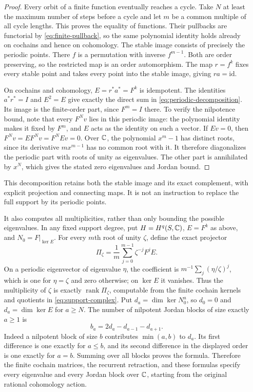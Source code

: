\begin{proof}
Every orbit of a finite function eventually reaches a cycle. Take $N$
at least the maximum number of steps before a cycle and let $m$ be
a common multiple of all cycle lengths. This proves the equality of
functions. Their pullbacks are functorial by
\eqref{eq:finite-pullback}, so the same polynomial identity holds
already on cochains and hence on cohomology.
The stable image consists of precisely the periodic points. There
$f$ is a permutation with inverse $f^{m-1}$. Both are order preserving,
so the restricted map is an order automorphism. The map $r=f^k$ fixes
every stable point and takes every point into the stable image,
giving $ra=\mathrm{id}$.

On cochains and cohomology, $E=r^*a^*=F^k$ is idempotent.
The identities $a^*r^*=I$ and $E^2=E$ give exactly the direct sum
in \eqref{eq:periodic-decomposition}. Its image is the finite-order
part, since $F^m=I$ there. To verify the nilpotence bound, note that
every $F^N v$ lies in this periodic image: the polynomial identity
makes it fixed by $F^m$, and $E$ acts as the identity on such a vector.
If $Ev=0$, then $F^Nv=EF^Nv=F^NEv=0$.
Over $\mathbb C$, the polynomial $x^m-1$ has distinct roots, since its
derivative $mx^{m-1}$ has no common root with it. It therefore
diagonalizes the periodic part with roots of unity as eigenvalues.
The other part is annihilated by $x^N$, which gives the stated zero
eigenvalues and Jordan bound.
\end{proof}

This decomposition retains both the stable image and its exact
complement, with explicit projection and connecting maps. It is not
an instruction to replace the full support by its periodic points.

It also computes all multiplicities, rather than only bounding the
possible eigenvalues. In any fixed support degree, put $H=H^q(S,\mathbb C)$,
$E=F^k$ as above, and $N_0=F|_{\ker E}$. For every $m$th root of
unity $\zeta$, define the exact projector
\[
 \Pi_\zeta=\frac1m\sum_{j=0}^{m-1}\zeta^{-j}F^jE.
 \tag{SE10a}\label{eq:periodic-projectors}
\]
On a periodic eigenvector of eigenvalue $\eta$, the coefficient is
$m^{-1}\sum_j(\eta/\zeta)^j$, which is one for $\eta=\zeta$
and zero otherwise; on $\ker E$ it vanishes. Thus the multiplicity
of $\zeta$ is exactly $\operatorname{rank}\Pi_\zeta$, computable
from the finite cochain kernels and quotients in
\eqref{eq:support-complex}. Put $d_a=\dim\ker N_0^a$, so $d_0=0$
and $d_a=\dim\ker E$ for $a\ge N$. The number of nilpotent Jordan
blocks of size exactly $a\ge1$ is
\[
 b_a=2d_a-d_{a-1}-d_{a+1}.
 \tag{SE10b}\label{eq:nilpotent-block-count}
\]
Indeed a nilpotent block of size $b$ contributes $\min(a,b)$ to
$d_a$. Its first difference is one exactly for $a\le b$, and
its second difference in the displayed order is one exactly for
$a=b$. Summing over all blocks proves the formula. Therefore the
finite cochain matrices, the recurrent retraction, and these formulas
specify every eigenvalue and every Jordan block over $\mathbb C$, starting
from the original rational cohomology action.


